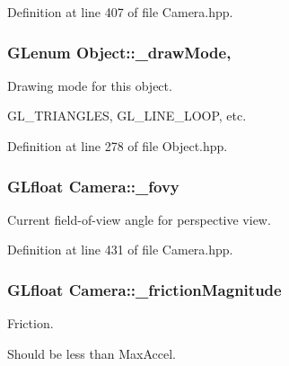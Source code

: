 Definition at line 407 of file Camera.\-hpp.

\hypertarget{class_object_ae8457eabfb89d55826142508013b56c0}{
\subsubsection[{\-\_\-draw\-Mode}]{\setlength{\rightskip}{0pt plus 5cm}G\-Lenum Object\-::\-\_\-draw\-Mode\hspace{0.3cm}{\ttfamily [protected]}, {\ttfamily [inherited]}}}\label{class_object_ae8457eabfb89d55826142508013b56c0}


Drawing mode for this object. 

G\-L\-\_\-\-T\-R\-I\-A\-N\-G\-L\-E\-S, G\-L\-\_\-\-L\-I\-N\-E\-\_\-\-L\-O\-O\-P, etc. 

Definition at line 278 of file Object.\-hpp.

\hypertarget{class_camera_a82542bb76347e2a2bb66b3bb7842945b}{
\subsubsection[{\-\_\-fovy}]{\setlength{\rightskip}{0pt plus 5cm}G\-Lfloat Camera\-::\-\_\-fovy\hspace{0.3cm}{\ttfamily [private]}}}\label{class_camera_a82542bb76347e2a2bb66b3bb7842945b}


Current field-\/of-\/view angle for perspective view. 



Definition at line 431 of file Camera.\-hpp.

\hypertarget{class_camera_a66fb66da0ccd400c4986dc19276b6716}{
\subsubsection[{\-\_\-friction\-Magnitude}]{\setlength{\rightskip}{0pt plus 5cm}G\-Lfloat Camera\-::\-\_\-friction\-Magnitude\hspace{0.3cm}{\ttfamily [private]}}}\label{class_camera_a66fb66da0ccd400c4986dc19276b6716}


Friction. 

Should be less than Max\-Accel. 

